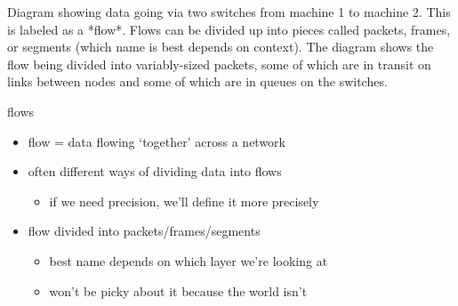\begin{frame}
{
}{
Diagram showing data going via two switches from machine 1 to machine 2. This is labeled as a *flow*. Flows can be divided up into pieces
called packets, frames, or segments (which name is best depends on context). The diagram shows the flow being divided into
variably-sized packets, some of which are in transit on links between nodes and some of which are in queues on the switches.
}
\end{frame}

\begin{frame}{flows}
\begin{itemize}
\item flow = data flowing `together' across a network
\item often different ways of dividing data into flows
    \begin{itemize}
    \item if we need precision, we'll define it more precisely
    \end{itemize}
\item flow divided into packets/frames/segments
    \begin{itemize}
    \item best name depends on which layer we're looking at
    \item won't be picky about it because the world isn't
    \end{itemize}
\end{itemize}
\end{frame}

